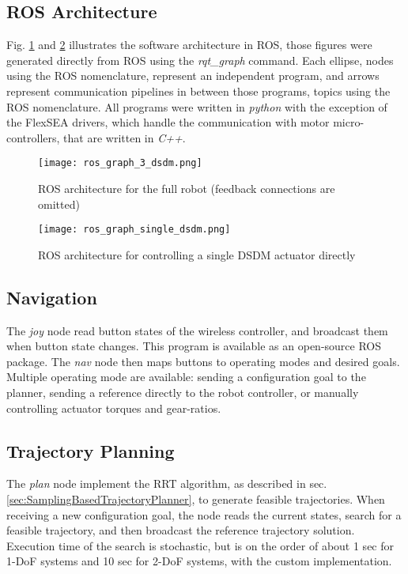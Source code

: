 \subsection{ROS Architecture}

Fig. \ref{fig:ros_3dsdm} and \ref{fig:ros_dsdm} illustrates the software architecture in ROS, those figures were generated directly from ROS using the \textit{rqt\_graph} command. Each ellipse, nodes using the ROS nomenclature, represent an independent program, and arrows represent communication pipelines in between those programs, topics using the ROS nomenclature. All programs were written in \textit{python} with the exception of the FlexSEA drivers, which handle the communication with motor micro-controllers, that are written in \textit{C++}.

\begin{figure}[htpb]
	\centering
		\texttt{[image: ros\_graph\_3\_dsdm.png]}
	\caption{ROS architecture for the full robot (feedback connections are omitted)}
	\label{fig:ros_3dsdm}
\end{figure}

\begin{figure}[htpb]
	\centering
		\texttt{[image: ros\_graph\_single\_dsdm.png]}
	\caption{ROS architecture for controlling a single DSDM actuator directly}
	\label{fig:ros_dsdm}
\end{figure}


\subsection{Navigation}

The \textit{joy} node read button states of the wireless controller, and broadcast them when button state changes. This program is available as an open-source ROS package. The \textit{nav} node then maps buttons to operating modes and desired goals. Multiple operating mode are available: sending a configuration goal to the planner, sending a reference directly to the robot controller, or manually controlling actuator torques and gear-ratios. 

\subsection{Trajectory Planning}

The \textit{plan} node implement the RRT algorithm, as described in sec. \ref{sec:SamplingBasedTrajectoryPlanner}, to generate feasible trajectories. When receiving a new configuration goal, the node reads the current states, search for a feasible trajectory, and then broadcast the reference trajectory solution. Execution time of the search is stochastic, but is on the order of about 1 sec for 1-DoF systems and 10 sec for 2-DoF systems, with the custom implementation.

